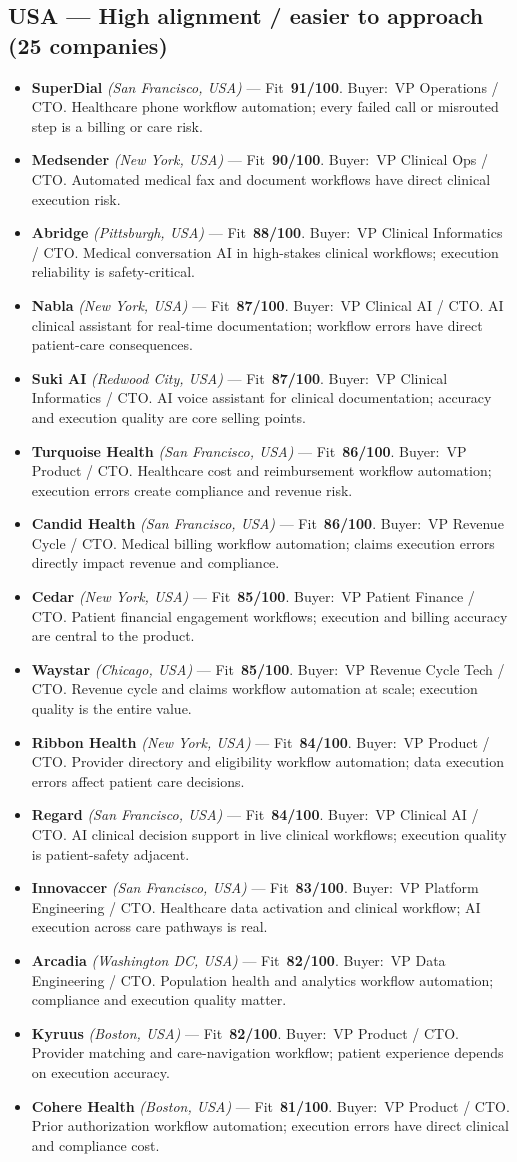 \documentclass[10pt]{article}
\newcommand{\cand}[5]{\item \textbf{#1} \textit{(#2)} --- Fit~\textbf{#3/100}. Buyer:~#4. #5}
\newcommand{\topcand}[5]{\item \textcolor{green!50!black}{\textbf{#1} \textit{(#2)}} --- Fit~\textbf{#3/100}. Buyer:~#4. #5}
\begin{document}
\subsection{USA --- High alignment / easier to approach (25 companies)}
\begin{itemize}
\topcand{SuperDial}{San Francisco, USA}{91}{VP Operations / CTO}{Healthcare phone workflow automation; every failed call or misrouted step is a billing or care risk.}
\topcand{Medsender}{New York, USA}{90}{VP Clinical Ops / CTO}{Automated medical fax and document workflows have direct clinical execution risk.}
\cand{Abridge}{Pittsburgh, USA}{88}{VP Clinical Informatics / CTO}{Medical conversation AI in high-stakes clinical workflows; execution reliability is safety-critical.}
\cand{Nabla}{New York, USA}{87}{VP Clinical AI / CTO}{AI clinical assistant for real-time documentation; workflow errors have direct patient-care consequences.}
\cand{Suki AI}{Redwood City, USA}{87}{VP Clinical Informatics / CTO}{AI voice assistant for clinical documentation; accuracy and execution quality are core selling points.}
\cand{Turquoise Health}{San Francisco, USA}{86}{VP Product / CTO}{Healthcare cost and reimbursement workflow automation; execution errors create compliance and revenue risk.}
\cand{Candid Health}{San Francisco, USA}{86}{VP Revenue Cycle / CTO}{Medical billing workflow automation; claims execution errors directly impact revenue and compliance.}
\cand{Cedar}{New York, USA}{85}{VP Patient Finance / CTO}{Patient financial engagement workflows; execution and billing accuracy are central to the product.}
\cand{Waystar}{Chicago, USA}{85}{VP Revenue Cycle Tech / CTO}{Revenue cycle and claims workflow automation at scale; execution quality is the entire value.}
\cand{Ribbon Health}{New York, USA}{84}{VP Product / CTO}{Provider directory and eligibility workflow automation; data execution errors affect patient care decisions.}
\cand{Regard}{San Francisco, USA}{84}{VP Clinical AI / CTO}{AI clinical decision support in live clinical workflows; execution quality is patient-safety adjacent.}
\cand{Innovaccer}{San Francisco, USA}{83}{VP Platform Engineering / CTO}{Healthcare data activation and clinical workflow; AI execution across care pathways is real.}
\cand{Arcadia}{Washington DC, USA}{82}{VP Data Engineering / CTO}{Population health and analytics workflow automation; compliance and execution quality matter.}
\cand{Kyruus}{Boston, USA}{82}{VP Product / CTO}{Provider matching and care-navigation workflow; patient experience depends on execution accuracy.}
\cand{Cohere Health}{Boston, USA}{81}{VP Product / CTO}{Prior authorization workflow automation; execution errors have direct clinical and compliance cost.}

\end{itemize}
\end{document}
